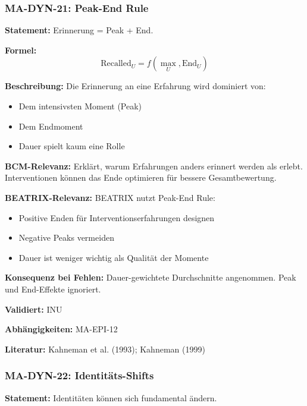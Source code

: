 \subsubsection*{MA-DYN-21: Peak-End Rule}

\textbf{Statement:} Erinnerung = Peak + End.

\textbf{Formel:}
\begin{equation}
\text{Recalled}_U = f(\max_U, \text{End}_U)
\end{equation}

\textbf{Beschreibung:}
Die Erinnerung an eine Erfahrung wird dominiert von:
\begin{itemize}
    \item Dem intensivsten Moment (Peak)
    \item Dem Endmoment
    \item Dauer spielt kaum eine Rolle
\end{itemize}

\textbf{BCM-Relevanz:}
Erklärt, warum Erfahrungen anders erinnert werden als erlebt. Interventionen können das Ende optimieren für bessere Gesamtbewertung.

\textbf{BEATRIX-Relevanz:}
BEATRIX nutzt Peak-End Rule:
\begin{itemize}
    \item Positive Enden für Interventionserfahrungen designen
    \item Negative Peaks vermeiden
    \item Dauer ist weniger wichtig als Qualität der Momente
\end{itemize}

\textbf{Konsequenz bei Fehlen:}
Dauer-gewichtete Durchschnitte angenommen. Peak und End-Effekte ignoriert.

\textbf{Validiert:} INU

\textbf{Abhängigkeiten:} MA-EPI-12

\textbf{Literatur:} Kahneman et al. (1993); Kahneman (1999)


\subsubsection*{MA-DYN-22: Identitäts-Shifts}

\textbf{Statement:} Identitäten können sich fundamental ändern.

